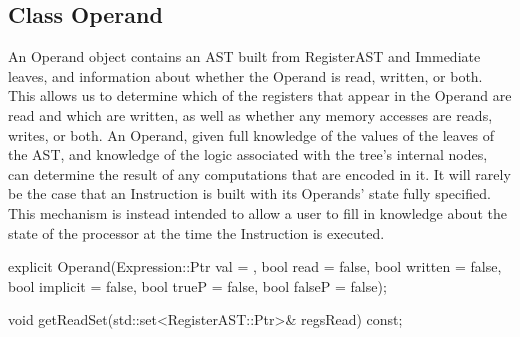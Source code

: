 \subsection{Class Operand}
\label{sec:operand}


An Operand object contains an AST built from RegisterAST and Immediate leaves,
and information about whether the Operand is read, written, or both. This allows
us to determine which of the registers that appear in the Operand are read and
which are written, as well as whether any memory accesses are reads, writes, or
both. An Operand, given full knowledge of the values of the leaves of the AST,
and knowledge of the logic associated with the tree's internal nodes, can
determine the result of any computations that are encoded in it. It will rarely
be the case that an Instruction is built with its Operands' state fully
specified. This mechanism is instead intended to allow a user to fill in
knowledge about the state of the processor at the time the Instruction is
executed.

\begin{apient}
explicit Operand(Expression::Ptr val = {},
                 bool read = false,
                 bool written = false,
                 bool implicit = false,
                 bool trueP = false,
                 bool falseP = false);
\end{apient}

\begin{apient}
void getReadSet(std::set<RegisterAST::Ptr>& regsRead) const;
\end{apient}


